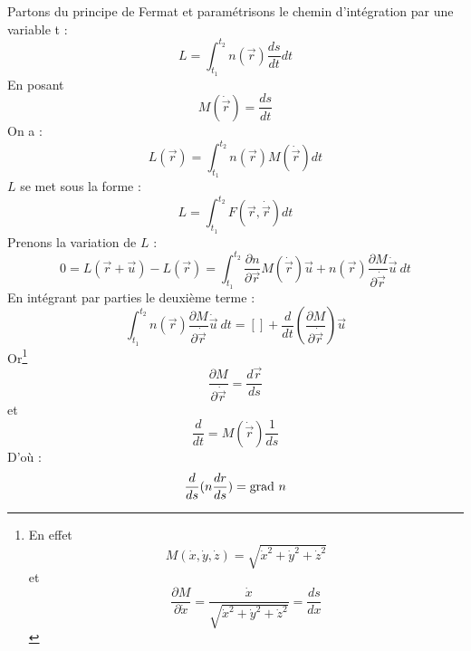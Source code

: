 \documentclass[12pt]{book}
\begin{document}
\begin{pf}
Partons du principe de Fermat et
param\'etrisons le chemin d'int\'egration par une variable t :
\begin{equation}
L=\int_{t_1}^{t_2} n(\vec r) \frac{ds}{dt}dt
\end{equation}
En posant 
\begin{equation}
M(\dot{\vec r})=\frac{ds}{dt} 
\end{equation}
On a :
\begin{equation}
L(\vec r)=\int_{t_1}^{t_2} n(\vec r) M(\dot{\vec r})dt
\end{equation}
$L$ se met sous la forme :
\begin{equation}
L=\int_{t_1}^{t_2} F(\vec r,\dot{\vec r})dt
\end{equation}
Prenons la variation de $L$ :
\begin{equation}
0=L(\vec r + \vec u)-L(\vec r )=\int_{t_1}^{t_2} \frac{\partial
n}{\partial \vec r} M(\dot{\vec r}) \vec u+n(\vec r) \frac{\partial
M}{\partial \dot{\vec r}}\dot{\vec u}\ dt
\end{equation}
En int\'egrant par parties le deuxi\`eme terme :
\begin{equation}
\int_{t_1}^{t_2}n(\vec r) \frac{\partial M}{\partial \dot{\vec
r}}\dot{\vec u}\ dt=[]+\frac{d}{dt}( \frac{\partial M}{\partial \dot{\vec
r}})\vec u
\end{equation}
Or\footnote{%
En effet
\begin{equation}
M(\dot x,\dot y, \dot z)=\sqrt{\dot x^2+\dot y^2+\dot z^2}
\end{equation}
et
\begin{equation}
\frac{\partial M}{\partial \dot x}=\frac{\dot x}{\sqrt{\dot x^2+\dot y^2+\dot z^2}}=\frac{ds}{dx}
\end{equation}
}%
\begin{equation}
\frac{\partial M}{\partial \dot{\vec r}}=\frac{d\vec r}{ds}
\end{equation}
et
\begin{equation}
\frac{d}{dt}={M(\dot{\vec r})}\frac{1}{ds}
\end{equation}
D'o\`u :
\begin{equation}
\frac{d}{ds}(n\frac{dr}{ds})=\grad\ n
\end{equation}
\end{pf}
\end{document}
